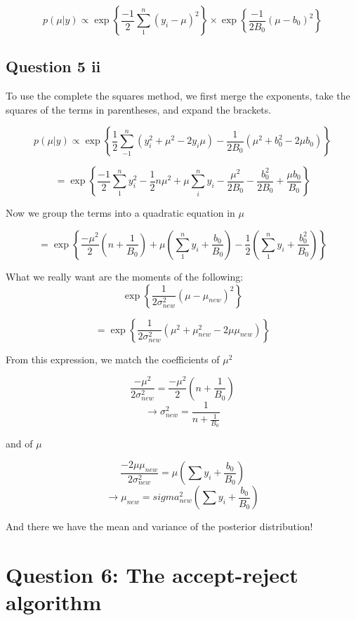 \documentclass[a4paper,11pt]{article}
\begin{document}
\[
p(\mu|y) \propto \exp\left\{\frac{-1}{2}\sum_{1}^{n}(y_{i}-\mu)^{2}\right\} \times \exp\left\{\frac{-1}{2B_{0}}(\mu-b_{0})^{2}\right\}
\]

\subsection*{Question 5 ii}

To use the complete the squares method, we first merge the exponents, take the squares of the terms in parentheses, and expand the brackets.

\[
p(\mu|y) \propto \exp\left\{\frac{1}{2} \sum_{-1}^{n} \left(y_{i}^{2} + \mu^{2} - 2y_{i}\mu \right) - \frac{1}{2B_{0}}\left(\mu^{2} + b_{0}^{2} - 2\mu b_{0}\right) \right\}
\]

\[
= \exp\left\{\frac{-1}{2} \sum_{1}^{n} y_{i}^{2} - \frac{1}{2}n\mu^{2} +\mu\sum_{i}^{n}y_{i} - \frac{\mu^{2}}{2B_{0}} - \frac{b_{0}^{2}}{2B_{0}} + \frac{\mu b_{0}}{B_{0}} \right\}
\]

Now we group the terms into a quadratic equation in $\mu$

\[
=\exp\left\{\frac{-\mu^{2}}{2}\left(n + \frac{1}{B_{0}}\right) + \mu\left(\sum_{1}^{n}y_{i} + \frac{b_{0}}{B_{0}}\right) - \frac{1}{2}\left(\sum_{1}^{n}y_{i} + \frac{b_{0}^{2}}{B_{0}}\right)\right\}
\]


What we really want are the moments of the following:
\[
\exp\left\{\frac{1}{2\sigma_{new}^{2}}\left(\mu-\mu_{new}\right)^{2}\right\}
\]

\[
=\exp \left\{\frac{1}{2\sigma_{new}^{2}} \left(\mu^{2}+\mu_{new}^{2} - 2 \mu \mu_{new}\right)\right\}
\]

From this expression, we match the coefficients of $\mu^{2}$

\[
\frac{-\mu^{2}}{2\sigma^{2}_{new}} = \frac{-\mu^{2}}{2} \left(n + \frac{1}{B_{0}}\right)
\]
\[
\rightarrow \sigma^{2}_{new} = \frac{1}{n + \frac{1}{B_{0}}}
\]

and of $\mu$

\[
\frac{-2\mu\mu_{new}}{2\sigma_{new}^{2}} = \mu\left(\sum y_{i} + \frac{b_{0}}{B_{0}}\right)
\]
\[
\rightarrow\mu_{new} = sigma_{new}^{2}\left(\sum y_{i} + \frac{b_{0}}{B_{0}}\right)
\]

And there we have the mean and variance of the posterior distribution!

\section*{Question 6: The accept-reject algorithm}
\end{document}

